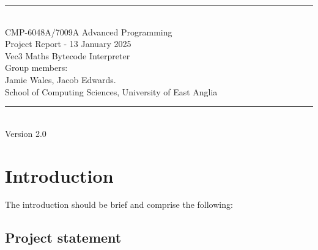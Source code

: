 \documentclass[a4paper, oneside, 11pt]{report}
\begin{document}
\begin{titlepage}
\begin{center}
\rule{12cm}{1mm} \\
\vspace{1cm}
{\large  CMP-6048A/7009A Advanced Programming} %
\vspace{7.5cm}
\\{\Large Project Report - 13 January 2025}
\vspace{1.5cm}
\\{\LARGE Vec3 Maths Bytecode Interpreter} %
\vspace{1.0cm}
\\{\Large Group members: \\ Jamie Wales, Jacob Edwards.\ }
\vspace{10.0cm}
\\{\large School of Computing Sciences, University of East Anglia}
\\ \rule{12cm}{0.5mm}
\\ \hspace{8.5cm} {\large Version 2.0}
\end{center}
\end{titlepage}


\setcounter{page}{1}

\begin{abstract}
Vec3 is a bytecode interpreted maths language complete with a GUI, plotting, full static type inference and various 
maths functions.

The language is designed to be simple to use and understand, with a focus on strict mathematical expressions and 
plotting, but with more powerful constructs such as recursive bindings, first class functions and static type inference.

The language and GUI are written in F\#.
\end{abstract}

\chapter{Introduction}\label{ch:intro}

The introduction should be brief and comprise the following:

\section{Project statement}\label{sec:project-statement}
\end{document}
